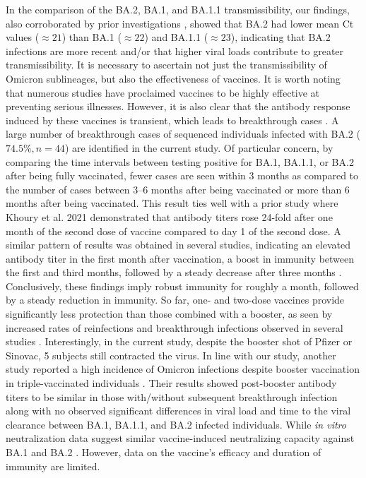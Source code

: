 In the comparison of the BA.2, BA.1, and BA.1.1 transmissibility, our findings, also corroborated by prior investigations \citep{qassim2022effects, lentini2022monitoring, kirsebom2022covid}, showed that BA.2 had lower mean Ct values ($\approx21$) than BA.1 ($\approx22$) and BA.1.1 ($\approx23$), indicating that BA.2 infections are more recent and/or that higher viral loads contribute to greater transmissibility.
It is necessary to ascertain not just the transmissibility of Omicron sublineages, but also the effectiveness of vaccines.
It is worth noting that numerous studies have proclaimed vaccines to be highly effective at preventing serious illnesses. %
However, it is also clear that the antibody response induced by these vaccines is transient, which leads to breakthrough cases \citep{haque2022mitigating, bruel2022serum, seaman2022vaccine}.
A large number of breakthrough cases of sequenced individuals infected with BA.2 ($74.5\%, n=44$) are identified in the current study.
Of particular concern, by comparing the time intervals between testing positive for BA.1, BA.1.1, or BA.2 after being fully vaccinated, fewer cases are seen within 3 months as compared to the number of cases between 3--6 months after being vaccinated or more than 6 months after being vaccinated.
This result ties well with a prior study where Khoury et al. 2021 \citep{khoury2021covid} demonstrated that antibody titers rose 24-fold after one month of the second dose of vaccine compared to day 1 of the second dose.
A similar pattern of results was obtained in several studies, indicating an elevated antibody titer in the first month after vaccination, a boost in immunity between the first and third months, followed by a steady decrease after three months \citep{chemaitelly2021waning, levin2021waning}.
Conclusively, these findings imply robust immunity for roughly a month, followed by a steady reduction in immunity.
So far, one- and two-dose vaccines provide significantly less protection than those combined with a booster, as seen by increased rates of reinfections and breakthrough infections observed in several studies \citep{healthline-covid19-vaccines, stasi2022sars}.
Interestingly, in the current study, despite the booster shot of Pfizer or Sinovac, 5 subjects still contracted the virus.
In line with our study, another study reported a high incidence of Omicron infections despite booster vaccination in triple-vaccinated individuals \citep{marking2022high}. 
Their results showed post-booster antibody titers to be similar in those with/without subsequent breakthrough infection along with no observed significant differences in viral load and time to the viral clearance between BA.1, BA.1.1, and BA.2 infected individuals.
While \textit{in vitro} neutralization data suggest similar vaccine-induced neutralizing capacity against BA.1 and BA.2 \citep{evans2022neutralization}.
However, data on the vaccine's efficacy and duration of immunity are limited.

